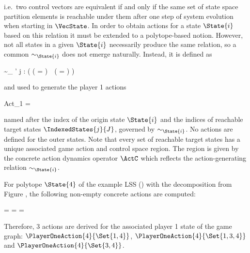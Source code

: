     i.e.\ two control vectors are equivalent if and only if the same set of state space partition elements is reachable under them after one step of system evolution when starting in $\VecState$.
    In order to obtain actions for a state $\State{i}$ based on this relation it must be extended to a polytope-based notion.
    However, not all states in a given $\State{i}$ necessarily produce the same relation, so a common $\sim_{\State{i}}$ does not emerge naturally.
    Instead, it is defined as

    \startformula
        \VecControl \sim_{} \VecControl' \;\Longleftrightarrow\;
        \forall j \in \StateIndices: \Big(
            (  \cap {} = \emptyset ) \,\leftrightarrow\,
            (  \cap {} = \emptyset )
        \Big)
    \stopformula

    and used to generate the player 1 actions

    \startformula
        Act_1 =  \EndComma
    \stopformula

    named after the index of the origin state $\State{i}$ and the indices of reachable target states $\IndexedStates{j}{J}$, governed by $\sim_{\State{i}}$.
    No actions are defined for the outer states.
    Note that every set of reachable target states has a unique associated game action and control space region.
    The region is given by the concrete action dynamics operator $\ActC$ which reflects the action-generating relation $\sim_{\State {i}}$.

    For polytope $\State{4}$ of the example LSS () with the decomposition from Figure , the following non-empty concrete actions are computed:

    \startformula
        \startalign[n=2,align={left,left}]
            \NC {}
            \NC =  \EndComma
            \NR
            \NC {}
            \NC =  \EndAnd
            \NR
            \NC {}
            \NC =  \EndPeriod
            \NR
        \stopalign
    \stopformula

    Therefore, 3 actions are derived for the associated player 1 state of the game graph: $\PlayerOneAction{4}{\Set{1, 4}}$, $\PlayerOneAction{4}{\Set{1, 3, 4}}$ and $\PlayerOneAction{4}{\Set{3, 4}}$.

